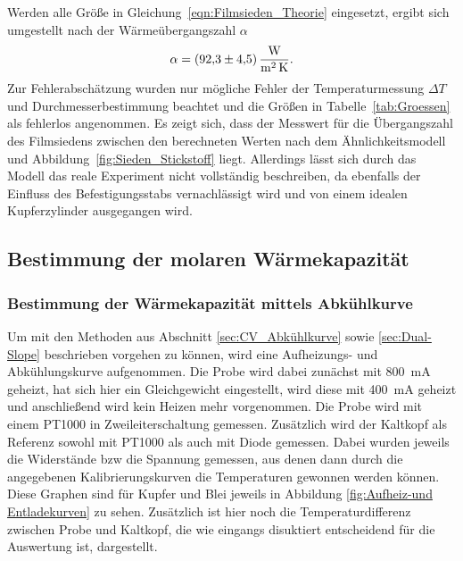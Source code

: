 \documentclass[parskip=half, a4paper,twoside,final]{article}
\begin{document}
Werden alle Größe in Gleichung~\eqref{eqn:Filmsieden_Theorie} eingesetzt, ergibt sich umgestellt nach der Wärmeübergangszahl $\alpha$
\begin{align}
  \alpha = \SI{92.3\pm 4.5}{\watt\per\metre\squared\per\kelvin}.
\end{align}
Zur Fehlerabschätzung wurden nur mögliche Fehler der Temperaturmessung $\Delta T$ und Durchmesserbestimmung beachtet und die Größen in Tabelle~\ref{tab:Groessen} als fehlerlos angenommen. Es zeigt sich, dass der Messwert für die Übergangszahl des Filmsiedens zwischen den berechneten Werten nach dem Ähnlichkeitsmodell und Abbildung~\ref{fig:Sieden_Stickstoff} liegt. Allerdings lässt sich durch das Modell das reale Experiment nicht vollständig beschreiben, da ebenfalls der Einfluss des Befestigungsstabs vernachlässigt wird und von einem idealen Kupferzylinder ausgegangen wird.

\subsection{Bestimmung der molaren Wärmekapazität}
\subsubsection{Bestimmung der Wärmekapazität mittels Abkühlkurve}
Um mit den Methoden aus Abschnitt \ref{sec:CV_Abkühlkurve} sowie \ref{sec:Dual-Slope} beschrieben vorgehen zu können, wird eine Aufheizungs- und Abkühlungskurve aufgenommen. Die Probe wird dabei zunächst mit \SI{800}{\milli\ampere} geheizt, hat sich hier ein Gleichgewicht eingestellt, wird diese mit \SI{400}{\milli\ampere} geheizt und anschließend wird kein Heizen mehr vorgenommen. Die Probe wird mit einem PT1000 in Zweileiterschaltung gemessen. Zusätzlich wird der Kaltkopf als Referenz sowohl mit PT1000 als auch mit Diode gemessen. Dabei wurden jeweils die Widerstände bzw die Spannung gemessen, aus denen dann durch die angegebenen Kalibrierungskurven die Temperaturen gewonnen werden können. Diese Graphen sind für Kupfer und Blei jeweils in Abbildung \ref{fig:Aufheiz-und Entladekurven} zu sehen. Zusätzlich ist hier noch die Temperaturdifferenz zwischen Probe und Kaltkopf, die wie eingangs disuktiert entscheidend für die Auswertung ist, dargestellt.
\end{document}
